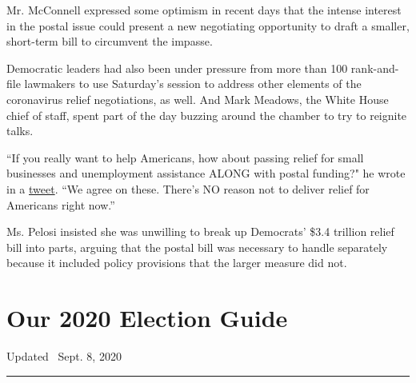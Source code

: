 Mr. McConnell expressed some optimism in recent days that the intense
interest in the postal issue could present a new negotiating opportunity
to draft a smaller, short-term bill to circumvent the impasse.

Democratic leaders had also been under pressure from more than 100
rank-and-file lawmakers to use Saturday's session to address other
elements of the coronavirus relief negotiations, as well. And Mark
Meadows, the White House chief of staff, spent part of the day buzzing
around the chamber to try to reignite talks.

``If you really want to help Americans, how about passing relief for
small businesses and unemployment assistance ALONG with postal funding?"
he wrote in a
\href{https://twitter.com/MarkMeadows/status/1297196107982942209}{tweet}.
``We agree on these. There's NO reason not to deliver relief for
Americans right now.''

Ms. Pelosi insisted she was unwilling to break up Democrats' \$3.4
trillion relief bill into parts, arguing that the postal bill was
necessary to handle separately because it included policy provisions
that the larger measure did not.

\hypertarget{our-2020-election-guide}{%
\section{Our 2020 Election Guide}\label{our-2020-election-guide}}

Updated ~Sept. 8, 2020

\begin{center}\rule{0.5\linewidth}{\linethickness}\end{center}

